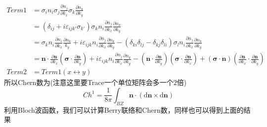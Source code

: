 \documentclass{article}
\numberwithin{equation}{subsection}
\begin{document}
\begin{equation}
    \begin{split}
        Term1&=\sigma_i n_i\sigma_j\frac{\partial n_j}{\partial k_x}\sigma_k\frac{\partial n_k}{\partial k_y}\\
        &=(\delta_{ij}+i\varepsilon_{ijk'}\sigma_{k'})\sigma_kn_i\frac{\partial n_j}{\partial k_x}\frac{\partial n_k}{\partial k_y}\\
        &=\sigma_k n_i\frac{\partial n_i}{\partial k_x}\frac{\partial n_k}{k_y}+i\varepsilon_{ijk}n_i\frac{\partial n_j}{\partial k_x}\frac{\partial n_k}{\partial k_y}-(\delta_{ki}\delta_{lj}-\delta_{kj}\delta_{li})\sigma_ln_i\frac{\partial n_j}{\partial k_x}\frac{\partial n_k}{\partial k_y}\\
        &=\mathbf{n}\cdot\frac{\partial\mathbf{n}}{\partial k_x}(\bm{\sigma}\cdot\frac{\partial\mathbf{n}}{\partial k_y})+i\varepsilon_{ijk}n_i\frac{\partial n_j}{\partial k_x}\frac{\partial n_k}{\partial k_y}-(\mathbf{n}\cdot\frac{\partial\mathbf{n}}{\partial k_y})(\bm{\sigma}\cdot\frac{\partial\mathbf{n}}{\partial k_x})+(\bm{\sigma}\cdot\mathbf{n})(\frac{\partial\mathbf{n}}{\partial k_x}\cdot\frac{\partial\mathbf{n}}{\partial k_y})\\
        Term2&=Term1(x\leftrightarrow y)
    \end{split}
\end{equation}
所以Chern数为(注意这里要Trace一个单位矩阵会多一个$2$倍)
\begin{equation}
    Ch^1=\frac{1}{8\pi}\int_{BZ}\mathbf{n}\cdot(\mathrm{d}\mathbf{n}\times\mathrm{d}\mathbf{n})
\end{equation}
利用Bloch波函数，我们可以计算Berry联络和Chern数，同样也可以得到上面的结果
\end{document}
